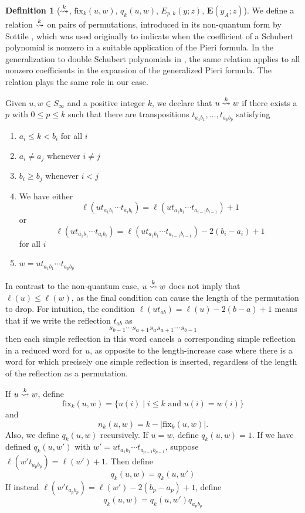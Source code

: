 \documentclass{amsart}
\theoremstyle{definition}
\newtheorem{definition}[lemma]{Definition}
\theoremstyle{remark}
\numberwithin{equation}{section}
\newcommand{\xrightsquigarrow}[2][]{%
	\mathrel{\mathop{\rightsquigarrow}\limits^{\scriptstyle #2}%
	\ifx\hfuzz#1\hfuzz\else_{\scriptstyle #1}\fi}%
}
\newcommand{\tom}[1]{\ensuremath{\xrightsquigarrow{#1}}}
\newcommand{\fx}{\mathrm{fix}}
\newcommand{\wte}{\mathbf{E}}
\begin{document}
\begin{definition}[$\tom{k}$, $\fx_{k}(u,w)$, $q_k(u,w)$, $E_{p,k}(y;z)$, $\wte(y_A;z)$] \label{definition:pieri}
We define a relation $\tom{k}$ on pairs of permutations, introduced in its non-quantum form by Sottile \cite{sottile}, which was used originally to indicate when the coefficient of a Schubert polynomial is nonzero in a suitable application of the Pieri formula. In the generalization to double Schubert polynomials in \cite{samuelmolev}, the same relation applies to all nonzero coefficients in the expansion of the generalized Pieri formula. The relation plays the same role in our case. 

Given $u,w\in S_\infty$ and a positive integer $k$, we declare that $u\tom{k} w$ if there exists a $p$ with $0\leq p\leq k$ such that there are transpositions $t_{a_1b_1},\ldots,t_{a_pb_p}$ satisfying 
\begin{enumerate}
\item $a_i\leq k<b_i$ for all $i$
\item $a_i\neq a_j$ whenever $i\neq j$
\item $b_i\geq b_j$ whenever $i<j$
\item We have either
$$\ell(ut_{a_1b_1}\cdots t_{a_ib_i})=\ell(ut_{a_1b_1}\cdots t_{a_{i-1}b_{i-1}})+1$$ 
or 
$$\ell(ut_{a_1b_1}\cdots t_{a_ib_i})=\ell(ut_{a_1b_1}\cdots t_{a_{i-1}b_{i-1}})-2(b_i-a_i)+1$$
for all $i$
\item $w=ut_{a_1b_1}\cdots t_{a_pb_p}$
\end{enumerate}
In contrast to the non-quantum case, $u\tom{k} w$ does not imply that $\ell(u) \leq \ell(w)$, as the final condition can cause the length of the permutation to drop. For intuition, the condition $\ell(ut_{ab}) = \ell(u) - 2(b - a) + 1$ means that if we write the reflection $t_{ab}$ as
$$s_{b-1}\cdots s_{a+1}s_as_{a+1}\cdots s_{b-1}$$
then each simple reflection in this word cancels a corresponding simple reflection in a reduced word for $u$, as opposite to the length-increase case where there is a word for which precisely one simple reflection is inserted, regardless of the length of the reflection as a permutation.

If $u\tom{k} w$, define 
$$\fx_{k}(u,w)=\{u(i)\mid i\leq k\mbox{ and }u(i)=w(i)\}$$
and
$$n_k(u,w)=k-\lvert\fx_k(u,w)\rvert.$$
Also, we define $q_k(u,w)$ recursively. If $u=w$, define $q_k(u,w)=1$. If we have defined $q_k(u,w')$ with $w'=ut_{a_1b_1}\cdots t_{a_{p-1}b_{p-1}}$, suppose $\ell(w't_{a_pb_p})=\ell(w')+1$. Then define
$$q_k(u,w)=q_k(u,w')$$
If instead $\ell(w't_{a_pb_p})=\ell(w')-2(b_p-a_p)+1$, define
$$q_k(u,w)=q_k(u,w')q_{a_pb_p}$$


\end{definition}
\end{document}
